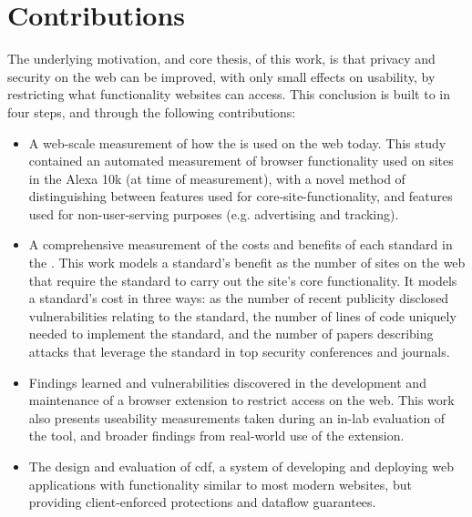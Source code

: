 \section{Contributions}
\label{intro:contributions}

The underlying motivation, and core thesis, of this work, is that privacy
and security on the web can be improved, with only small effects on usability,
by restricting what functionality websites can access.  This conclusion
is built to in four steps, and through the following contributions:

\begin{itemize}
    \item A web-scale measurement of how the \WAPI is used on the web today.
          This study contained an automated measurement of browser functionality
          used on sites in the Alexa 10k (at time of measurement), with
          a novel method of distinguishing between features used
          for core-site-functionality, and features used for
          non-user-serving purposes (e.g. advertising and tracking).
    \item A comprehensive measurement of the costs and benefits of each standard
          in the \WAPI.  This work models a standard's
          benefit as the number of sites on the web that require the standard
          to carry out the site's core functionality.  It models
          a standard's cost in three ways: as the number of recent publicity
          disclosed vulnerabilities relating to the standard, the number
          of lines of code uniquely needed to implement the standard, and
          the number of papers describing attacks that leverage the standard
          in top security conferences and journals.
    \item Findings learned and vulnerabilities discovered in the development
          and maintenance of a browser extension to restrict \WAPI access on
          the web.  This work also presents useability
          measurements taken during an in-lab evaluation of the tool, and
          broader findings from real-world use of the extension.
    \item The design and evaluation of \gls{cdf}, a system of developing and deploying
          web applications with functionality similar to most modern websites,
          but providing client-enforced protections and dataflow
          guarantees.
\end{itemize}
